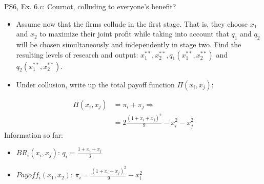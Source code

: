 \begin{frame}{PS6, Ex. 6.c: Cournot, colluding to everyone's benefit?}
    \begin{itemize}
    \item[(c)] Assume now that the firms collude in the first stage. That is, they choose $x_1$ and $x_2$ to maximize their joint profit while taking into account that $q_1$ and $q_2$ will be chosen simultaneously and independently in stage two. Find the resulting levels of research and output: $x_1^{**},x_2^{**},q_1(x_1^{**},x_2^{**})$ and $q_2(x_1^{**},x_2^{**})$.
    \end{itemize}
  \begin{multicols}{2}
    \begin{itemize}
      \item[(Step a)] Under collusion, write up the total payoff function $\Pi(x_i,x_j)$:
    \end{itemize}
    \begin{align*}
      \Pi(x_i,x_j)&=\pi_i+\pi_j\Rightarrow\\
                  &=2\frac{(1+x_i+x_j)^2}{9}-x_i^2-x_j^2
    \end{align*}
    \vfill\null \columnbreak
    Information so far:
    \begin{itemize}
      \item[1] $BR_i(x_i,x_j)$: $q_i = \frac{1+x_i+x_j}{3}$
      \item[2] $Payoff_i(x_1,x_2)$: $\pi_i=\frac{(1+x_i+x_j)^2}{9}-x_i^2$
    \end{itemize}
    \vfill\null
  \end{multicols}
\end{frame}
